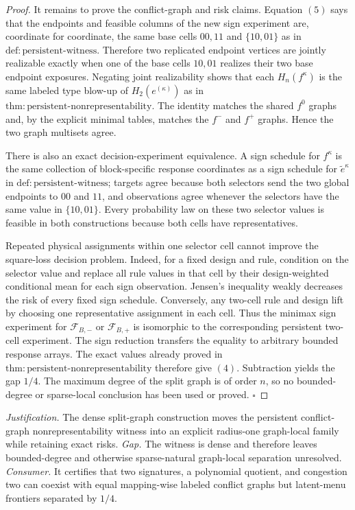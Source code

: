\documentclass{article}
\begin{document}
\begin{proof}
It remains to prove the conflict-graph and risk claims. Equation \((5)\) says that the endpoints and feasible columns of the new sign experiment are, coordinate for coordinate, the same base cells \(00,11\) and \(\{10,01\}\) as in \(\mathrm{def{:}persistent\text{-}witness}\). Therefore two replicated endpoint vertices are jointly realizable exactly when one of the base cells \(10,01\) realizes their two base endpoint exposures. Negating joint realizability shows that each \(H_n(f^\kappa)\) is the same labeled type blow-up of \(H_2(e^{(\kappa)})\) as in \(\mathrm{thm{:}persistent\text{-}nonrepresentability}\). The identity matches the shared \(f^0\) graphs and, by the explicit minimal tables, matches the \(f^-\) and \(f^+\) graphs. Hence the two graph multisets agree.

There is also an exact decision-experiment equivalence. A sign schedule for \(f^\kappa\) is the same collection of block-specific response coordinates as a sign schedule for \(\widetilde e^\kappa\) in \(\mathrm{def{:}persistent\text{-}witness}\); targets agree because both selectors send the two global endpoints to \(00\) and \(11\), and observations agree whenever the selectors have the same value in \(\{10,01\}\). Every probability law on these two selector values is feasible in both constructions because both cells have representatives.

Repeated physical assignments within one selector cell cannot improve the square-loss decision problem. Indeed, for a fixed design and rule, condition on the selector value and replace all rule values in that cell by their design-weighted conditional mean for each sign observation. Jensen's inequality weakly decreases the risk of every fixed sign schedule. Conversely, any two-cell rule and design lift by choosing one representative assignment in each cell. Thus the minimax sign experiment for \(\mathcal F_{B,-}\) or \(\mathcal F_{B,+}\) is isomorphic to the corresponding persistent two-cell experiment. The sign reduction transfers the equality to arbitrary bounded response arrays. The exact values already proved in \(\mathrm{thm{:}persistent\text{-}nonrepresentability}\) therefore give \((4)\). Subtraction yields the gap \(1/4\). The maximum degree of the split graph is of order \(n\), so no bounded-degree or sparse-local conclusion has been used or proved. \(\square\)
\end{proof}
\par\smallskip\noindent \textit{Justification.} The dense split-graph construction moves the persistent conflict-graph nonrepresentability witness into an explicit radius-one graph-local family while retaining exact risks. \textit{Gap.} The witness is dense and therefore leaves bounded-degree and otherwise sparse-natural graph-local separation unresolved. \textit{Consumer.} It certifies that two signatures, a polynomial quotient, and congestion two can coexist with equal mapping-wise labeled conflict graphs but latent-menu frontiers separated by \(1/4\).
\end{document}
